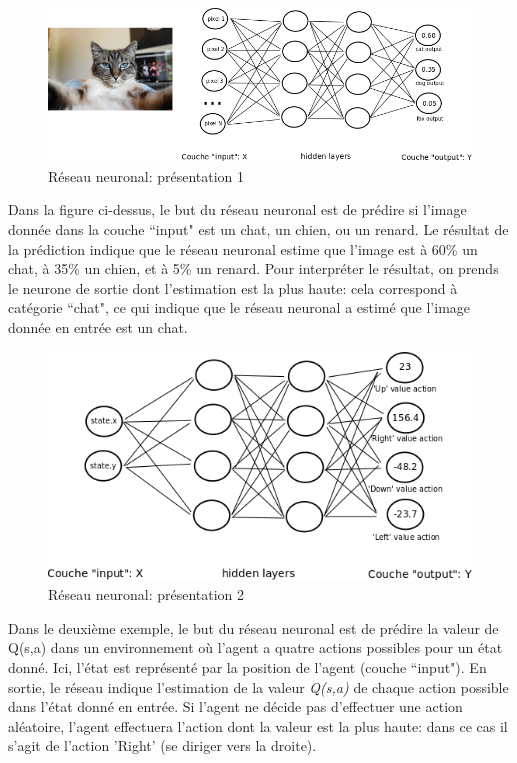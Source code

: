 \documentclass[11pt,a4paper]{report}
\begin{document}
    \begin{figure}[!h]
    \center
    \includegraphics[scale=0.56]{ressources/nn_presentation_1.png}
    \caption{Réseau neuronal: présentation 1}
    \end{figure} 
    
    \par Dans la figure ci-dessus, le but du réseau neuronal est de prédire si l'image donnée dans la couche ``input" est un chat, un chien, ou un renard. Le résultat de la prédiction indique que le réseau neuronal estime que l'image est à 60\% un chat, à 35\% un chien, et à 5\% un renard. Pour interpréter le résultat, on prends le neurone de sortie dont l'estimation est la plus haute: cela correspond à catégorie ``chat", ce qui indique que le réseau neuronal a estimé que l'image donnée en entrée est un chat. 
    
    \begin{figure}[!h]
    \center
    \includegraphics[scale=0.68]{ressources/nn_presentation_2.png}
    \caption{Réseau neuronal: présentation 2}
    \end{figure} 
    
    \par Dans le deuxième exemple, le but du réseau neuronal est de prédire la valeur de Q(s,a) dans un environnement où l'agent a quatre actions possibles pour un état donné. Ici, l'état est représenté par la position de l'agent (couche ``input"). En sortie, le réseau indique l'estimation de la valeur \textit{Q(s,a)} de chaque action possible dans l'état donné en entrée. Si l'agent ne décide pas d'effectuer une action aléatoire, l'agent effectuera l'action dont la valeur est la plus haute: dans ce cas il s'agit de l'action 'Right' (se diriger vers la droite). 
    
\end{document}
